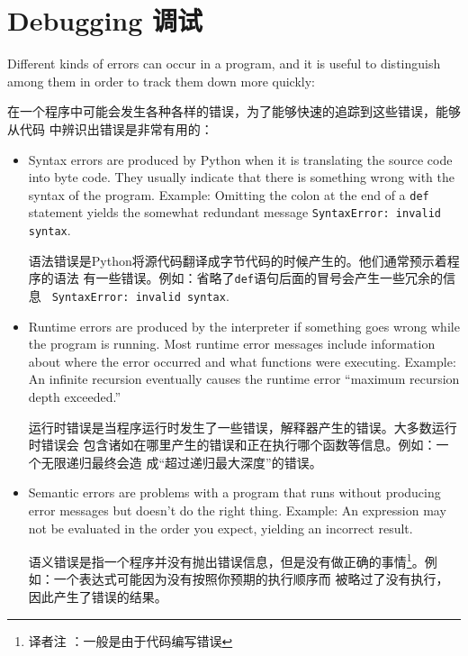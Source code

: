 \documentclass[10pt]{book}
\begin{document}
\begin{CJK}{UTF8}{gbsn}
\begin{exercise}
\end{exercise}



\appendix

\chapter{Debugging 调试}


Different kinds of errors can occur
in a program, and it is useful to distinguish among them
in order to track them down more quickly:

在一个程序中可能会发生各种各样的错误，为了能够快速的追踪到这些错误，能够从代码
中辨识出错误是非常有用的：

\begin{itemize}

\item Syntax errors are produced by Python when it is translating the
  source code into byte code.  They usually indicate that there is
  something wrong with the syntax of the program.  Example: Omitting
  the colon at the end of a {\tt def} statement yields the somewhat
  redundant message {\tt SyntaxError: invalid syntax}.

  语法错误是Python将源代码翻译成字节代码的时候产生的。他们通常预示着程序的语法
  有一些错误。例如：省略了{\tt def}语句后面的冒号会产生一些冗余的信息 {\tt
  SyntaxError: invalid syntax}.

\item Runtime errors are produced by the interpreter if something goes
  wrong while the program is running.  Most runtime error messages
  include information about where the error occurred and what
  functions were executing.  Example: An infinite recursion eventually
  causes the runtime error ``maximum recursion depth exceeded.''

  运行时错误是当程序运行时发生了一些错误，解释器产生的错误。大多数运行时错误会
  包含诸如在哪里产生的错误和正在执行哪个函数等信息。例如：一个无限递归最终会造
  成``超过递归最大深度''的错误。

\item Semantic errors are problems with a program that runs without
  producing error messages but doesn't do the right thing.  Example:
  An expression may not be evaluated in the order you expect, yielding
  an incorrect result.

  语义错误是指一个程序并没有抛出错误信息，但是没有做正确的事情\footnote{译者注
  ：一般是由于代码编写错误}。例如：一个表达式可能因为没有按照你预期的执行顺序而
  被略过了没有执行，因此产生了错误的结果。


\end{itemize}
\end{CJK}
\end{document}
